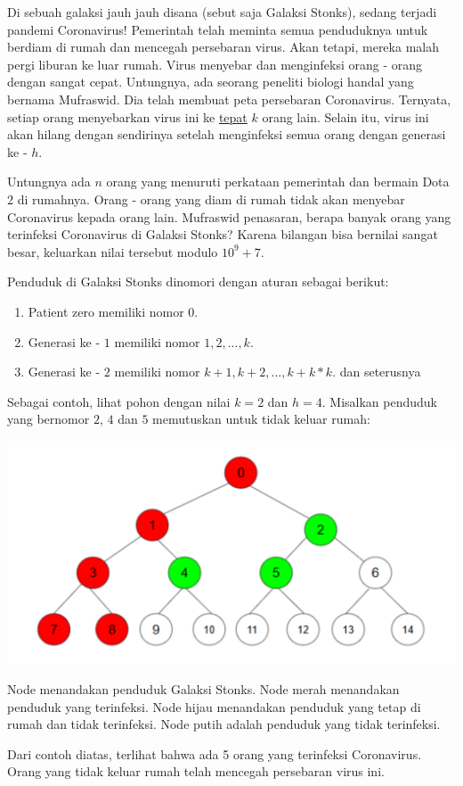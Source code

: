 \documentclass{article}
\begin{document}
Di sebuah galaksi jauh jauh disana (sebut saja Galaksi Stonks), sedang terjadi pandemi Coronavirus! Pemerintah telah meminta semua penduduknya untuk berdiam di rumah dan mencegah persebaran virus. Akan tetapi, mereka malah pergi liburan ke luar rumah. Virus menyebar dan menginfeksi orang - orang dengan sangat cepat. Untungnya, ada seorang peneliti biologi handal yang bernama Mufraswid. Dia telah membuat peta persebaran Coronavirus. Ternyata, setiap orang menyebarkan virus ini ke \underline{tepat} $k$ orang lain. Selain itu, virus ini akan hilang dengan sendirinya setelah menginfeksi semua orang dengan generasi ke - $h$.
\par
Untungnya ada $n$ orang yang menuruti perkataan pemerintah dan bermain Dota 2 di rumahnya. Orang - orang yang diam di rumah tidak akan menyebar Coronavirus kepada orang lain. Mufraswid penasaran, berapa banyak orang yang terinfeksi Coronavirus di Galaksi Stonks? Karena bilangan bisa bernilai sangat besar, keluarkan nilai tersebut modulo $10^9 + 7$.
\par
Penduduk di Galaksi Stonks dinomori dengan aturan sebagai berikut:
\begin{enumerate}
    \setlength\itemsep{0pt}
    \item Patient zero memiliki nomor $0$.
    \item Generasi ke - $1$ memiliki nomor $1, 2, ..., k$.
    \item Generasi ke - $2$ memiliki nomor $k+1, k+2, ..., k+k*k$.
    dan seterusnya
\end{enumerate}
\par
Sebagai contoh, lihat pohon dengan nilai $k = 2$ dan $h = 4$. Misalkan penduduk yang bernomor $2$, $4$ dan $5$ memutuskan untuk tidak keluar rumah:
\begin{center}
\includegraphics[scale=0.6]{tree}
\end{center}
Node menandakan penduduk Galaksi Stonks. Node merah menandakan penduduk yang terinfeksi. Node hijau menandakan penduduk yang tetap di rumah dan tidak terinfeksi. Node putih adalah penduduk yang tidak terinfeksi.
\par
Dari contoh diatas, terlihat bahwa ada 5 orang yang terinfeksi Coronavirus. Orang yang tidak keluar rumah telah mencegah persebaran virus ini.
\pagebreak
\end{document}
